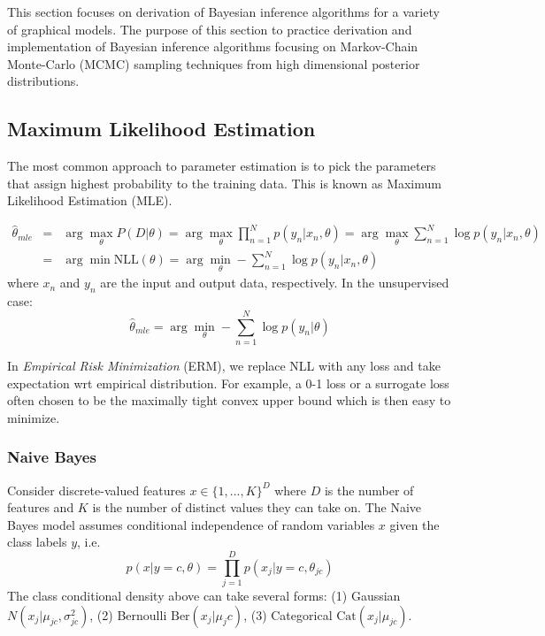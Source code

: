 This section focuses on derivation of Bayesian inference algorithms for a variety of graphical models. The purpose of this section to practice derivation and implementation of Bayesian inference algorithms focusing on Markov-Chain Monte-Carlo (MCMC) sampling techniques from high dimensional posterior distributions. 


\subsection{Maximum Likelihood Estimation}
The most common approach to parameter estimation is to pick the parameters that assign highest probability to the training data. This is known as Maximum Likelihood Estimation (MLE).

\begin{eqnarray}
    \hat{\theta}_{mle} &=& \arg\max_{\theta} P(D|\theta) = \arg\max_{\theta}\prod_{n=1}^{N}p(y_n|x_n, \theta) = \arg\max_{\theta}\sum_{n=1}^{N}\log p(y_n|x_n,\theta) \nonumber \\
    &=& \arg\min \mathrm{NLL}(\theta) = \arg\min_{\theta} - \sum_{n=1}^{N}\log p(y_n|x_n,\theta)
\end{eqnarray}
where $x_n$ and $y_n$ are the input and output data, respectively. In the unsupervised case:
\begin{equation}
 \hat{\theta}_{mle} =  \arg\min_{\theta} - \sum_{n=1}^{N}\log p(y_n|\theta)
\end{equation}

In \textit{Empirical Risk Minimization} (ERM), we replace NLL with any loss and take expectation wrt empirical distribution. For example, a 0-1 loss or a surrogate loss often chosen to be the maximally tight convex upper bound which is then easy to minimize.

\subsubsection{Naive Bayes}
Consider discrete-valued features $x \in \{1,...,K\}^{D}$ where $D$ is the number of features and $K$ is the number of distinct values they can take on. The Naive Bayes model assumes conditional independence of random variables $x$ given the class labels $y$, i.e.
\begin{equation}
    p(x|y=c, \theta) = \prod_{j=1}^{D} p(x_j|y=c, \theta_{jc})
\end{equation}
The class conditional density above can take several forms: (1) Gaussian $N(x_j|\mu_{jc}, \sigma_{jc}^{2})$, (2) Bernoulli $\mathrm{Ber}(x_j|\mu_jc)$, (3) Categorical $\mathrm{Cat}(x_j|\mu_{jc})$.\\

